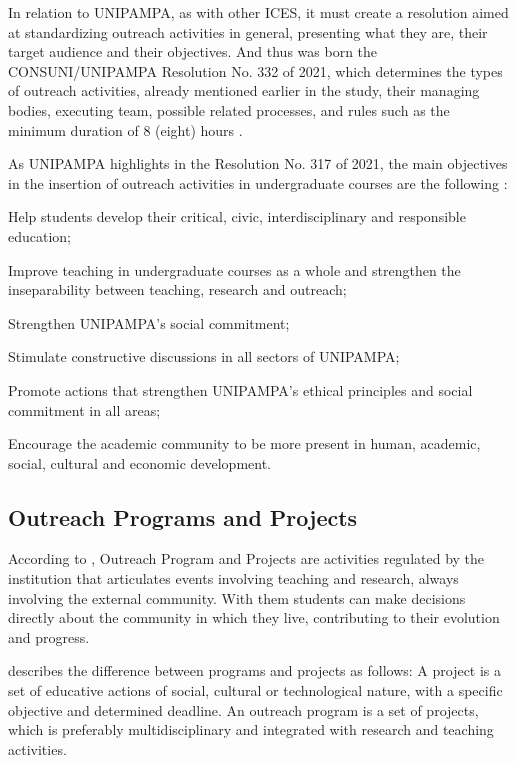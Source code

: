 In relation to \ac{UNIPAMPA}, as with other \ac{ICES}, it must create a resolution aimed at standardizing outreach activities in general, presenting what they are, their target audience and their objectives. And thus was born the CONSUNI/UNIPAMPA Resolution No. 332 of 2021, which determines the types of outreach activities, already mentioned earlier in the study, their managing bodies, executing team, possible related processes, and rules such as the minimum duration of 8 (eight) hours \cite{Resolucao-332:2021}.

As \ac{UNIPAMPA} highlights in the Resolution No. 317 of 2021, the main objectives in the insertion of outreach activities in undergraduate courses are the following \cite{res317}:
\begin{inparaenum}[(i)]
  \item Help students develop their critical, civic, interdisciplinary and responsible education;
  \item Improve teaching in undergraduate courses as a whole and strengthen the inseparability between teaching, research and outreach;
  \item Strengthen \ac{UNIPAMPA}'s social commitment;
  \item Stimulate constructive discussions in all sectors of \ac{UNIPAMPA};
  \item Promote actions that strengthen \ac{UNIPAMPA}'s ethical principles and social commitment in all areas;
  \item Encourage the academic community to be more present in human, academic, social, cultural and economic development.
\end{inparaenum}

\subsection{Outreach Programs and Projects}\label{sec:bac-programs-projects}

According to , Outreach Program and Projects are activities regulated by the institution that articulates events involving teaching and research, always involving the external community. With them students can make decisions directly about the community in which they live, contributing to their evolution and progress.

 describes the difference between programs and projects as follows: A project is a set of educative actions of social, cultural or technological nature, with a specific objective and determined deadline. An outreach program is a set of projects, which is preferably multidisciplinary and integrated with research and teaching activities.

